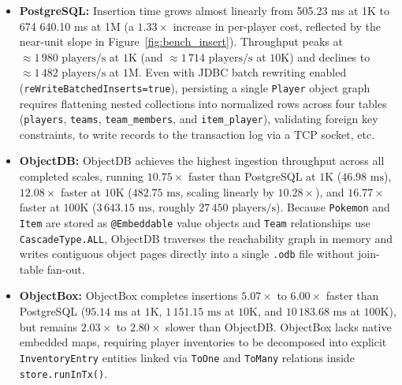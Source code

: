 \documentclass{article}
\begin{document}
\begin{itemize}
    \item \textbf{PostgreSQL:} Insertion time grows almost linearly from 505.23 ms at 1K to 674 640.10 ms at 1M (a $1.33\times$ increase in per-player cost, reflected by the near-unit slope in Figure~\ref{fig:bench_insert}). Throughput peaks at $\approx 1\,980\text{ players/s}$ at $1\text{K}$ (and $\approx 1\,714\text{ players/s}$ at $10\text{K}$) and declines to $\approx 1\,482\text{ players/s}$ at $1\text{M}$. Even with JDBC batch rewriting enabled (\texttt{reWrite\-BatchedInserts=true}), persisting a single \texttt{Player} object graph requires flattening nested collections into normalized rows across four tables (\texttt{players}, \texttt{teams}, \texttt{team\_members}, and \texttt{item\_player}), validating foreign key constraints, to write records to the transaction log via a TCP socket, etc.

    \item \textbf{ObjectDB:} ObjectDB achieves the highest ingestion throughput across all completed scales, running $10.75\times$ faster than PostgreSQL at $1\text{K}$ ($46.98\text{ ms}$), $12.08\times$ faster at $10\text{K}$ ($482.75\text{ ms}$, scaling linearly by $10.28\times$), and $16.77\times$ faster at $100\text{K}$ ($3\,643.15\text{ ms}$, roughly $27\,450\text{ players/s}$). Because \texttt{Pokemon} and \texttt{Item} are stored as \texttt{@Embeddable} value objects and \texttt{Team} relationships use \texttt{CascadeType.ALL}, ObjectDB traverses the reachability graph in memory and writes contiguous object pages directly into a single \texttt{.odb} file without join-table fan-out.

    \item \textbf{ObjectBox:} ObjectBox completes insertions $5.07\times$ to $6.00\times$ faster than PostgreSQL ($95.14\text{ ms}$ at $1\text{K}$, $1\,151.15\text{ ms}$ at $10\text{K}$, and $10\,183.68\text{ ms}$ at $100\text{K}$), but remains $2.03\times$ to $2.80\times$ slower than ObjectDB. ObjectBox lacks native embedded maps, requiring player inventories to be decomposed into explicit \texttt{InventoryEntry} entities linked via \texttt{ToOne} and \texttt{ToMany} relations inside \texttt{store.runInTx()}.
\end{itemize}
\end{document}
